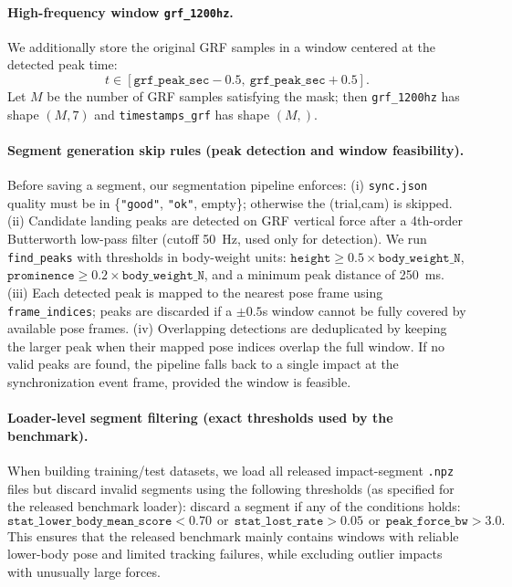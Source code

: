 \documentclass[sigconf,screen]{acmart}
\begin{document}
\paragraph{High-frequency window \texttt{grf\_1200hz}.}
We additionally store the original GRF samples in a window centered at the detected peak time:
\[
 t\in[\texttt{grf\_peak\_sec}-0.5,\ \texttt{grf\_peak\_sec}+0.5].
 \]
Let \(M\) be the number of GRF samples satisfying the mask; then \texttt{grf\_1200hz} has shape \((M,7)\) and \texttt{timestamps\_grf} has shape \((M,)\).

\paragraph{Segment generation skip rules (peak detection and window feasibility).}
Before saving a segment, our segmentation pipeline enforces:
(i) \texttt{sync.json} quality must be in \{\texttt{"good"}, \texttt{"ok"}, empty\}; otherwise the (trial,cam) is skipped.
(ii) Candidate landing peaks are detected on GRF vertical force after a 4th-order Butterworth low-pass filter (cutoff 50~Hz, used only for detection).
We run \texttt{find\_peaks} with thresholds in body-weight units:
\( \texttt{height} \ge 0.5\times \texttt{body\_weight\_N}\),
\( \texttt{prominence} \ge 0.2\times \texttt{body\_weight\_N}\),
and a minimum peak distance of 250~ms.
(iii) Each detected peak is mapped to the nearest pose frame using \texttt{frame\_indices}; peaks are discarded if a \(\pm 0.5\)s window cannot be fully covered by available pose frames.
(iv) Overlapping detections are deduplicated by keeping the larger peak when their mapped pose indices overlap the full window.
If no valid peaks are found, the pipeline falls back to a single impact at the synchronization event frame, provided the window is feasible.

\paragraph{Loader-level segment filtering (exact thresholds used by the benchmark).}
When building training/test datasets, we load all released impact-segment \texttt{.npz} files but discard invalid segments using the following thresholds (as specified for the released benchmark loader):
discard a segment if any of the conditions holds:
\[
\texttt{stat\_lower\_body\_mean\_score} < 0.70
\ \ \text{or}\ \ 
\texttt{stat\_lost\_rate} > 0.05
\ \ \text{or}\ \ 
\texttt{peak\_force\_bw} > 3.0.
\]
This ensures that the released benchmark mainly contains windows with reliable lower-body pose and limited tracking failures, while excluding outlier impacts with unusually large forces.
\end{document}
